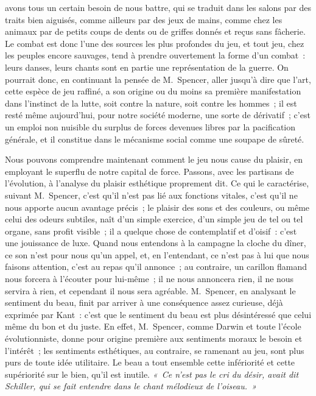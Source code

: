 \documentclass[french,twoside]{book} %
\begin{document}
avons tous un certain besoin de nous battre, qui se traduit dans les salons par des traits bien aiguisés, comme ailleurs par des jeux de mains, comme chez les animaux par de petits coups de dents ou de griffes donnés et reçus sans fâcherie. Le combat est donc l’une des sources les plus profondes du jeu, et tout jeu, chez les peuples encore sauvages, tend à prendre ouvertement la forme d’un combat : leurs danses, leurs chants sont en partie une représentation de la guerre. On pourrait donc, en continuant la pensée de M. Spencer, aller jusqu’à dire que l’art, cette espèce de jeu raffiné, a son origine ou du moins sa première manifestation dans l’instinct de la lutte, soit contre la nature, soit contre les hommes ; il est resté même aujourd’hui, pour notre société moderne, une sorte de dérivatif ; c’est un emploi non nuisible du surplus de forces devenues libres par la pacification générale, et il constitue dans le mécanisme social comme une soupape de sûreté.\par
Nous pouvons comprendre maintenant comment le jeu nous cause du plaisir, en employant le superflu de notre capital de force. Passons, avec les partisans de l’évolution, à l’analyse du plaisir esthétique proprement dit. Ce qui le caractérise, suivant M. Spencer, c’est qu’il n’est pas lié aux fonctions vitales, c’est qu’il ne nous apporte aucun avantage précis ; le plaisir des sons et des couleurs, ou même celui des odeurs subtiles, naît d’un simple exercice, d’un simple jeu de tel ou tel organe, sans profit visible ; il a quelque chose de contemplatif et d’oisif : c’est une jouissance de luxe. Quand nous entendons à la campagne la cloche du dîner, ce son n’est pour nous qu’un appel, et, en  l’entendant, ce n’est pas à lui que nous faisons attention, c’est au repas qu’il annonce ; au contraire, un carillon flamand nous forcera à l’écouter pour lui-même ; il ne nous annoncera rien, il ne nous servira à rien, et cependant il nous sera agréable. M. Spencer, en analysant le sentiment du beau, finit par arriver à une conséquence assez curieuse, déjà exprimée par Kant : c’est que le sentiment du beau est plus désintéressé que celui même du bon et du juste. En effet, M. Spencer, comme Darwin et toute l’école évolutionniste, donne pour origine première aux sentiments moraux le besoin et l’intérêt ; les sentiments esthétiques, au contraire, se ramenant au jeu, sont plus purs de toute idée utilitaire. Le beau a tout ensemble cette infériorité et cette supériorité sur le bien, qu’il est inutile. \emph{« Ce n’est pas le cri du désir, avait dit Schiller, qui se fait entendre dans le chant mélodieux de l’oiseau. »}\par
\end{document}
